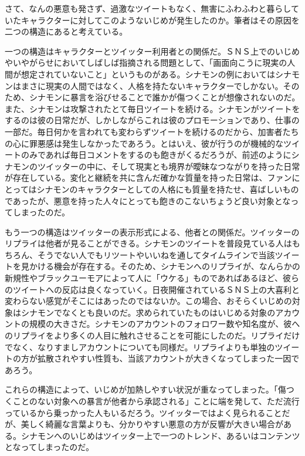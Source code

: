 \documentclass[b5j,twoside,twocolumn]{utarticle}
\begin{document}
さて、なんの悪意も発さず、過激なツイートもなく、無害にふわふわと暮らしていたキャラクターに対してこのようないじめが発生したのか。筆者はその原因を二つの構造にあると考えている。


一つの構造はキャラクターとツイッター利用者との関係だ。ＳＮＳ上でのいじめやいやがらせにおいてしばしば指摘される問題として、「画面向こうに現実の人間が想定されていないこと」というものがある。シナモンの例においてはシナモンはまさに現実の人間ではなく、人格を持たないキャラクターでしかない。そのため、シナモンに暴言を浴びせることで誰かが傷つくことが想像されないのだ。また、シナモンは攻撃されたとて毎日ツイートを続ける。シナモンがツイートをするのは彼の日常だが、しかしながらこれは彼のプロモーションであり、仕事の一部だ。毎日何かを言われても変わらずツイートを続けるのだから、加害者たちの心に罪悪感は発生しなかったであろう。とはいえ、彼が行うのが機械的なツイートのみであれば毎日コメントをするのも飽きがくるだろうが、前述のようにシナモンのツイッターの中に、そして現実とも境界が曖昧なつながりを持った日常が存在している。変化と継続を共に含んだ確かな質量を持った日常は、ファンにとってはシナモンのキャラクターとしての人格にも質量を持たせ、喜ばしいものであったが、悪意を持った人々にとっても飽きのこないちょうど良い対象となってしまったのだ。


もう一つの構造はツイッターの表示形式による、他者との関係だ。ツイッターのリプライは他者が見ることができる。シナモンのツイートを普段見ている人はもちろん、そうでない人でもリツートやいいねを通してタイムラインで当該ツイートを見かける機会が存在する。そのため、シナモンへのリプライが、なんらかの新規性やブラックユーモアによって人に「ウケる」ものであればあるほど、彼らのツイートへの反応は良くなっていく。日夜開催されているＳＮＳ上の大喜利と変わらない感覚がそこにはあったのではないか。この場合、おそらくいじめの対象はシナモンでなくとも良いのだ。求められていたものはいじめる対象のアカウントの規模の大きさだ。シナモンのアカウントのフォロワー数や知名度が、彼へのリプライをより多くの人目に触れさせることを可能にしたのだ。リプライだけでなく、なりすましアカウントについても同様だ。リプライよりも単独のツイートの方が拡散されやすい性質も、当該アカウントが大きくなってしまった一因であろう。


これらの構造によって、いじめが加熱しやすい状況が重なってしまった。「傷つくことのない対象への暴言が他者から承認される」ことに端を発して、ただ流行っているから乗っかった人もいるだろう。ツイッターではよく見られることだが、美しく綺麗な言葉よりも、分かりやすい悪意の方が反響が大きい場合がある。シナモンへのいじめはツイッター上で一つのトレンド、あるいはコンテンツとなってしまったのだ。
\end{document}
